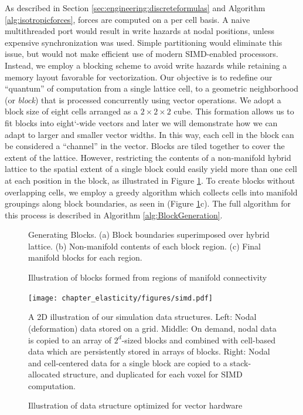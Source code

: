 As described in Section \ref{sec:engineering:discreteformulas} and Algorithm
\ref{alg:isotropicforces}, forces are computed on a per cell basis. A naive
multithreaded port would result in write hazards at nodal positions,
unless expensive synchronization was used. Simple partitioning would
eliminate this issue, but would not make efficient use of
modern SIMD-enabled processors. Instead, we employ a blocking scheme to avoid write
hazards while retaining a memory layout favorable for
vectorization. Our objective is to redefine our ``quantum'' of
computation from a single lattice cell, to a geometric neighborhood
(or \emph{block}) that is processed concurrently using vector
  operations.  We adopt a block size of eight cells
arranged as a $2\times 2\times 2$ cube. This formation
allows us to fit blocks into eight\char`-wide
vectors and later we will demonstrate how we can
adapt to larger and smaller vector widths. In this way,
each cell in the block can be considered a ``channel'' in the
vector.  Blocks are tiled together to cover the
  extent of the lattice. However, restricting the contents of a
  non-manifold hybrid lattice to the spatial extent of a single block
  could easily yield more than one cell at each position in the block,
  as illustrated in Figure \ref{fig:blocking}. To create blocks
  without overlapping cells, we employ a greedy algorithm which
  collects cells into manifold groupings along block boundaries, as
  seen in (Figure \ref{fig:blocking}c). The full algorithm for this
  process is described in Algorithm \ref{alg:BlockGeneration}.


\label{sec:blocking}
\begin{figure}[b!]
  \centering
  \def\svgwidth{\columnwidth}
  \vspace*{-.15in}
  
\vspace*{-.5in}
\caption{Illustration of blocks formed from regions of manifold connectivity}{Generating Blocks. (a) Block boundaries superimposed over
hybrid lattice. (b) Non-manifold contents of each block region. (c)
Final manifold blocks for each region.}
\label{fig:blocking}
\end{figure}
  
\begin{figure}[t]
   \texttt{[image: chapter\_elasticity/figures/simd.pdf]}
   \vspace*{-.3in}
   \caption{Illustration of data structure optimized for vector
     hardware}{A 2D illustration of our simulation data
     structures. Left: Nodal (deformation) data stored on a
     grid. Middle: On demand, nodal data is copied to an array of
     $2^d$-sized blocks and combined with cell-based data which are
     persistently stored in arrays of blocks. Right: Nodal and
     cell-centered data for a single block are copied to a
     stack-allocated structure, and duplicated for each voxel for SIMD
     computation.}
   \label{fig:simd}
   \vspace*{-.15in}
\end{figure}
  
